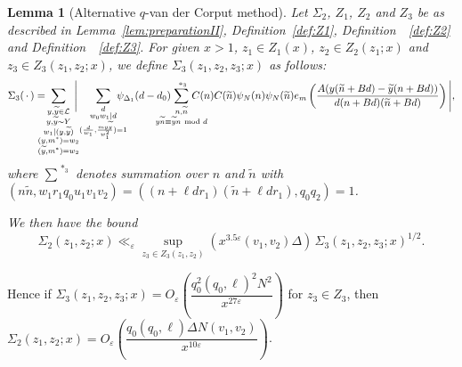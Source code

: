 \documentclass{amsart}
\newtheorem{lemma}{Lemma}
\numberwithin{equation}{section}
\begin{document}
\begin{lemma}[Alternative $q$-van der Corput method]\label{lem:qvanderCorputII}
Let $\Sigma_2$, $Z_1$, $Z_2$ and  $Z_3$ be as described in Lemma~{\rm \ref{lem:preparationII}}, Definition~{\rm \ref{def:Z1}}, Definition~~{\rm \ref{def:Z2}} and Definition~~{\rm \ref{def:Z3}}.
For given $x>1$, $z_1 \in Z_1(x)$, $z_2\in Z_2(z_1;x)$ and $z_3 \in Z_3(z_1,z_2;x)$,  we define  $\Sigma_3(z_1,z_2,z_3;x)$ as follows:
\begin{align*}
\Sigma_3(\, \cdot \,)= \!\!\!\!\!\! \sum_{\substack{y, \widetilde{y} \in \mathcal{L} \\ y, \widetilde{y} \sim Y \\ w_1 \mid (y, \widetilde{y}) \\ (y, m^*)=w_2 \\ (\widetilde{y}, m^*)=w_2}}\!\!\!\!\Bigg|\sum_{\substack{d \\ w_0w_1 \mid d  \\  (\frac{d}{w_1}, \frac{my\widetilde{y}}{w_1^2})=1}} \!\!\!\!\!\!\!\psi_{\Delta_1}(d-d_0) \!\!\!\!\!\!\!\!\!\!\sum_{\substack{n, \widetilde{n} \\ y\widetilde{n} \equiv 
\widetilde{y}n  \mbox{ \scriptsize mod } d}}^{\,\,*_3} \!\!\!\!\!\!\!\!\!\! C(n)  C(\widetilde{n})\psi_N(n)\psi_N(\widetilde{n}) e_{m}\left(\dfrac{A (y(\widetilde{n}+B d)-  \widetilde{y}(n+B d))}{d(n+B d)(\widetilde{n}+B d)}\right)\Bigg|,
\end{align*}
where $\sum\limits^{\,\,*_3}$ denotes summation over $n$ and $\widetilde{n}$ with $ (n\widetilde{n},w_1 r_1 q_0 u_1 v_1 v_2)=((n+\ell dr_1)(\widetilde{n}+\ell d r_1), q_0q_2)=1  $.

\medskip
We then have the bound
$$\Sigma_2(z_1,z_2;x) \ll_\varepsilon \sup_{z_3 \in Z_3(z_1,z_2)} (x^{3.5\varepsilon}(v_1,v_2)  \Delta) \, \Sigma_3(z_1,z_2,z_3;x)^{1/2}.$$
\end{lemma}

Hence if $\Sigma_3(z_1,z_2,z_3;x) = O_{\varepsilon}\!\left(\dfrac{q_0^2(q_0,\ell)^2 N^2}{x^{27\varepsilon}}\right) $ for $z_3 \in Z_3$,   then   $\Sigma_2(z_1,z_2;x) = O_{\varepsilon}\!\left(\dfrac{q_0(q_0,\ell)\Delta N (v_1,v_2)}{x^{10\varepsilon}}\right)$.
 
\end{document}
